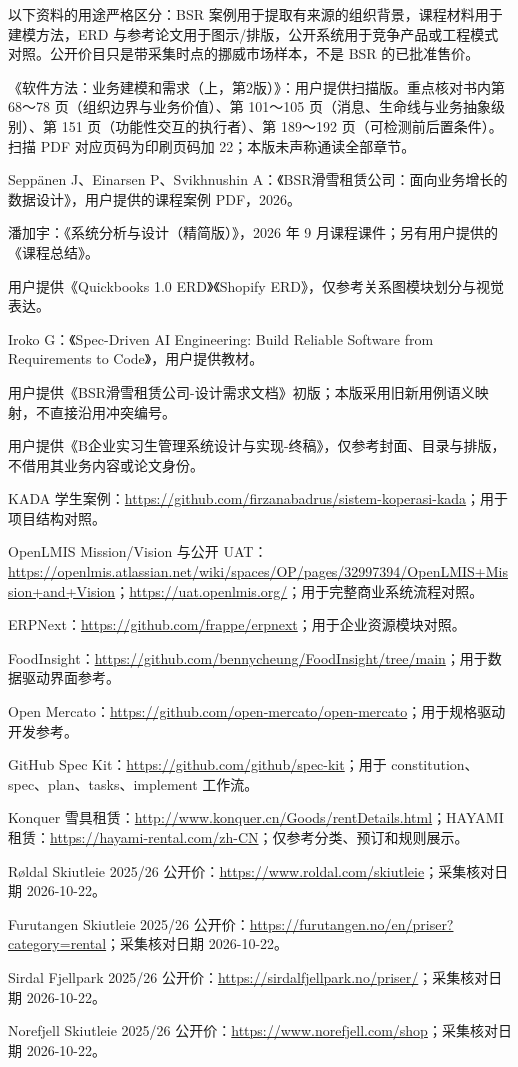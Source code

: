 \noindent 以下资料的用途严格区分：BSR 案例用于提取有来源的组织背景，课程材料用于建模方法，ERD 与参考论文用于图示/排版，公开系统用于竞争产品或工程模式对照。公开价目只是带采集时点的挪威市场样本，不是 BSR 的已批准售价。
\begin{enumerate}[label={[\arabic*]},leftmargin=2.8em,itemsep=4pt]
\item 《软件方法：业务建模和需求（上，第2版）》：用户提供扫描版。重点核对书内第 68～78 页（组织边界与业务价值）、第 101～105 页（消息、生命线与业务抽象级别）、第 151 页（功能性交互的执行者）、第 189～192 页（可检测前后置条件）。扫描 PDF 对应页码为印刷页码加 22；本版未声称通读全部章节。
\item Seppänen J、Einarsen P、Svikhnushin A：《BSR滑雪租赁公司：面向业务增长的数据设计》，用户提供的课程案例 PDF，2026。
\item 潘加宇：《系统分析与设计（精简版）》，2026 年 9 月课程课件；另有用户提供的《课程总结》。
\item 用户提供《Quickbooks 1.0 ERD》《Shopify ERD》，仅参考关系图模块划分与视觉表达。
\item Iroko G：《Spec-Driven AI Engineering: Build Reliable Software from Requirements to Code》，用户提供教材。
\item 用户提供《BSR滑雪租赁公司-设计需求文档》初版；本版采用旧新用例语义映射，不直接沿用冲突编号。
\item 用户提供《B企业实习生管理系统设计与实现-终稿》，仅参考封面、目录与排版，不借用其业务内容或论文身份。
\item KADA 学生案例：\url{https://github.com/firzanabadrus/sistem-koperasi-kada}；用于项目结构对照。
\item OpenLMIS Mission/Vision 与公开 UAT：\url{https://openlmis.atlassian.net/wiki/spaces/OP/pages/32997394/OpenLMIS+Mission+and+Vision}；\url{https://uat.openlmis.org/}；用于完整商业系统流程对照。
\item ERPNext：\url{https://github.com/frappe/erpnext}；用于企业资源模块对照。
\item FoodInsight：\url{https://github.com/bennycheung/FoodInsight/tree/main}；用于数据驱动界面参考。
\item Open Mercato：\url{https://github.com/open-mercato/open-mercato}；用于规格驱动开发参考。
\item GitHub Spec Kit：\url{https://github.com/github/spec-kit}；用于 constitution、spec、plan、tasks、implement 工作流。
\item Konquer 雪具租赁：\url{http://www.konquer.cn/Goods/rentDetails.html}；HAYAMI 租赁：\url{https://hayami-rental.com/zh-CN}；仅参考分类、预订和规则展示。
\item Røldal Skiutleie 2025/26 公开价：\url{https://www.roldal.com/skiutleie}；采集核对日期 2026-10-22。
\item Furutangen Skiutleie 2025/26 公开价：\url{https://furutangen.no/en/priser?category=rental}；采集核对日期 2026-10-22。
\item Sirdal Fjellpark 2025/26 公开价：\url{https://sirdalfjellpark.no/priser/}；采集核对日期 2026-10-22。
\item Norefjell Skiutleie 2025/26 公开价：\url{https://www.norefjell.com/shop}；采集核对日期 2026-10-22。
\end{enumerate}
